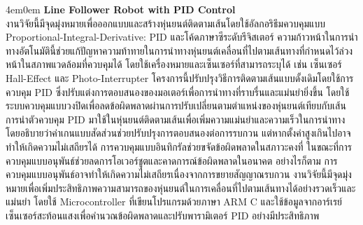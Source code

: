 \documentclass[14pt, fleqn, a4paper]{extarticle}
\begin{document}
\begin{adjustwidth}{4em}{0em}
	\textbf{Line Follower Robot with PID Control} \\
	\indent
	งานวิจัยนี้มีจุดมุ่งหมายเพื่อออกแบบและสร้างหุ่นยนต์ติดตามเส้นโดยใช้อัลกอริธึมควบคุมแบบ Proportional-Integral-Derivative: PID และโค้ดภาษาซีระดับรีจิสเตอร์ ความก้าวหน้าในการนำทางอัตโนมัตินี้ช่วยแก้ปัญหาความท้าทายในการนำทางหุ่นยนต์เคลื่อนที่ไปตามเส้นทางที่กำหนดไว้ล่วงหน้าในสภาพแวดล้อมที่ควบคุมได้ โดยใช้เครื่องหมายและเซ็นเซอร์ที่สามารถระบุได้ เช่น เซ็นเซอร์ Hall-Effect และ Photo-Interrupter โครงการนี้ปรับปรุงวิธีการติดตามเส้นแบบดั้งเดิมโดยใช้การควบคุม PID ซึ่งปรับแต่งการตอบสนองของมอเตอร์เพื่อการนำทางที่ราบรื่นและแม่นยำยิ่งขึ้น โดยใช้ระบบควบคุมแบบวงปิดเพื่อลดข้อผิดพลาดผ่านการปรับเปลี่ยนตามตำแหน่งของหุ่นยนต์เทียบกับเส้น การนำตัวควบคุม PID มาใช้ในหุ่นยนต์ติดตามเส้นเพื่อเพิ่มความแม่นยำและความเร็วในการนำทาง โดยอธิบายว่าค่าเกนแบบสัดส่วนช่วยปรับปรุงการตอบสนองต่อการรบกวน แต่หากตั้งค่าสูงเกินไปอาจทำให้เกิดความไม่เสถียรได้ การควบคุมแบบอินทิกรัลช่วยขจัดข้อผิดพลาดในสภาวะคงที่ ในขณะที่การควบคุมแบบอนุพันธ์ช่วยลดการโอเวอร์ชูตและคาดการณ์ข้อผิดพลาดในอนาคต อย่างไรก็ตาม การควบคุมแบบอนุพันธ์อาจทำให้เกิดความไม่เสถียรเนื่องจากการขยายสัญญาณรบกวน งานวิจัยนี้มีจุดมุ่งหมายเพื่อเพิ่มประสิทธิภาพความสามารถของหุ่นยนต์ในการเคลื่อนที่ไปตามเส้นทางได้อย่างรวดเร็วและแม่นยำ โดยใช้ Microcontroller ที่เขียนโปรแกรมด้วยภาษา ARM C และใช้ข้อมูลจากอาร์เรย์เซ็นเซอร์สะท้อนแสงเพื่อคำนวณข้อผิดพลาดและปรับพารามิเตอร์ PID อย่างมีประสิทธิภาพ
\end{adjustwidth}
\end{document}
